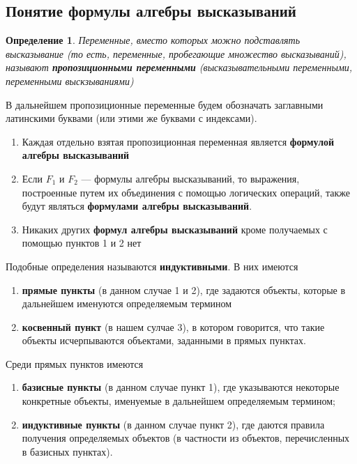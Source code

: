 \documentclass{article}
\newtheorem{definition}{Определение}
\begin{document}
\subsection{Понятие формулы алгебры высказываний}

\begin{definition}
    Переменные, вместо которых можно подставлять высказывание (то есть, переменные, пробегающие множество высказываний), называют \textbf{пропозиционными переменными} (высказывательными переменными, переменными выскзываниями)
\end{definition}

В дальнейшем пропозиционные переменные будем обозначать заглавными латинскими буквами (или этими же буквами с индексами).

\begin{enumerate}
    \item Каждая отдельно взятая пропозиционная переменная является \textbf{формулой алгебры высказываний}
    \item Если $F_1$ и $F_2$ — формулы алгебры высказываний, то выражения, построенные путем их объединения с помощью логических операций, также будут являться \textbf{формулами алгебры высказываний}.
    \item Никаких других \textbf{формул алгебры высказываний} кроме получаемых с помощью пунктов 1 и 2 нет
\end{enumerate}

Подобные определения называются \textbf{индуктивными}. В них имеются

\begin{enumerate}
    \item \textbf{прямые пункты} (в данном случае 1 и 2), где задаются объекты, которые в дальнейшем именуются определяемым термином 
    \item \textbf{косвенный пункт} (в нашем сулчае 3), в котором говорится, что такие объекты исчерпываются объектами, заданными в прямых пунктах.
\end{enumerate}

Среди прямых пунктов имеются

\begin{enumerate}
    \item \textbf{базисные пункты} (в данном случае пункт 1), где указываются некоторые конкретные объекты, именуемые в дальнейшем определяемым термином;
    \item \textbf{индуктивные пункты} (в данном случае пункт 2), где даются правила получения определяемых объектов (в частности из объектов, перечисленных в базисных пунктах).
\end{enumerate}
\end{document}
